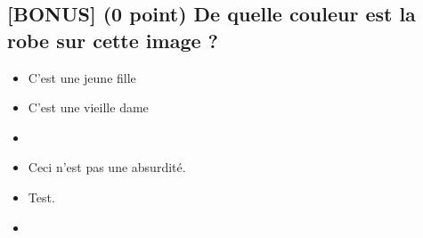 \documentclass[11pt,a4paper]{article}
\begin{document}
\vspace*{0.5cm}


\subsection{[BONUS] (0 point) De quelle couleur est la robe sur cette image ? }


\begin{table}[ht!]
  \centering
  \begin{minipage}{0.40\textwidth}
    \centering
\begin{itemize}
  \item[\CaseCoche] C'est une jeune fille \phantom{()} \\
  \item[\CaseCoche] C'est une vieille dame \phantom{()} \\
  \item[\CaseCoche]  \phantom{()} \\
\end{itemize}
  \end{minipage}
  \hfillx
  \begin{minipage}{0.50\textwidth}
    \centering
\begin{itemize}
  \item[\CaseCoche] Ceci n'est pas une absurdité. \phantom{()} \\
  \item[\checkmark] Test. ~ ~ ~  \phantom{()} \\
  \item[\CaseCoche] \phantom{()} \\
\end{itemize}
  \end{minipage}
\end{table}

\vfillLast
\end{document}
